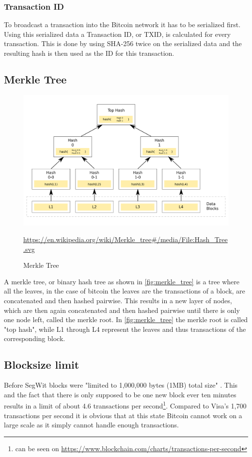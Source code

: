 \subsubsection{Transaction ID}
To broadcast a transaction into the Bitcoin network it has to be serialized first. Using this serialized data a Transaction ID, or TXID, is calculated for every transaction. This is done by using SHA-256 twice on the serialized data and the resulting hash is then used as the ID for this transaction.


\subsection{Merkle Tree}
\label{sec:Basics:MerkleTree}
\begin{figure}[!ht]
    \centering
    \includegraphics[width=(\textwidth * 2 / 3 )]{Ausarbeitung/images/merkle_tree.png}
    \caption[Merkle Tree]{Merkle Tree}
    \small \url{https://en.wikipedia.org/wiki/Merkle_tree#/media/File:Hash_Tree.svg} 
    \label{fig:merkle_tree}
\end{figure}
A merkle tree, or binary hash tree as shown in \autoref{fig:merkle_tree} is a tree where all the leaves, in the case of bitcoin the leaves are the transactions of a block, are concatenated and then hashed pairwise. This results in a new layer of nodes, which are then again concatenated and then hashed pairwise until there is only one node left, called the merkle root. In \autoref{fig:merkle_tree} the merkle root is called "top hash", while L1 through L4 represent the leaves and thus transactions of the corresponding block.


\subsection{Blocksize limit}
\label{sec:Basics:BlocksizeLimit}
Before SegWit blocks were "limited to 1,000,000 bytes (1MB) total size" \cite{bip-141}. This and the fact that there is only supposed to be one new block ever ten minutes \cite{nakamoto} results in a limit of about 4.6 transactions per second\footnote{can be seen on \url{https://www.blockchain.com/charts/transactions-per-second}}\cite{hackernoon}. Compared to Visa's 1,700 transactions per second \cite{hackernoon} it is obvious that at this state Bitcoin cannot work on a large scale as it simply cannot handle enough transactions.



